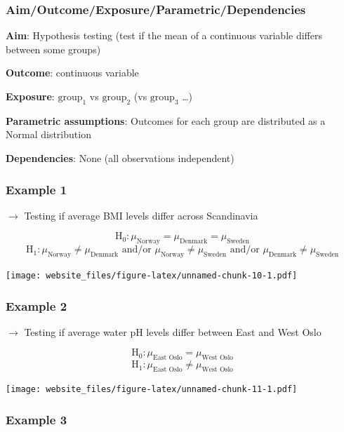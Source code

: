 \documentclass[12pt,]{article}
\begin{document}
\subsubsection{Aim/Outcome/Exposure/Parametric/Dependencies}\label{aimoutcomeexposureparametricdependencies-4}

\textbf{Aim}: Hypothesis testing (test if the mean of a continuous
variable differs between some groups)

\textbf{Outcome}: continuous variable

\textbf{Exposure}: \(\text{group}_1\) vs \(\text{group}_2\) (vs
\(\text{group}_3\) \ldots{})

\textbf{Parametric assumptions}: Outcomes for each group are distributed
as a Normal distribution

\textbf{Dependencies}: None (all observations independent)

\newpage

\subsubsection{Example 1}\label{example-1-3}

\(\rightarrow\) Testing if average BMI levels differ across Scandinavia

\[\text{H}_0: \mu_{\text{Norway}} = \mu_{\text{Denmark}} = \mu_{\text{Sweden}}\]
\[\text{H}_1: \mu_{\text{Norway}} \ne \mu_{\text{Denmark}} \text{ and/or } \mu_{\text{Norway}} \ne \mu_{\text{Sweden}}  \text{ and/or } \mu_{\text{Denmark}} \ne \mu_{\text{Sweden}}\]

\texttt{[image: website\_files/figure-latex/unnamed-chunk-10-1.pdf]}

\newpage

\subsubsection{Example 2}\label{example-2-3}

\(\rightarrow\) Testing if average water pH levels differ between East
and West Oslo

\[\text{H}_0: \mu_{\text{East Oslo}} = \mu_{\text{West Oslo}}\]
\[\text{H}_1: \mu_{\text{East Oslo}} \ne \mu_{\text{West Oslo}}\]

\texttt{[image: website\_files/figure-latex/unnamed-chunk-11-1.pdf]}

\subsubsection{Example 3}\label{example-3-3}
\end{document}
